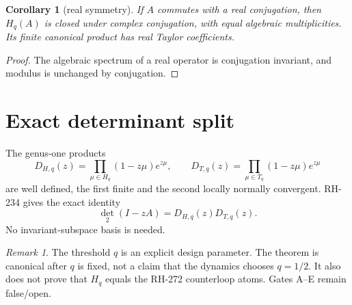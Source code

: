 \documentclass[11pt]{article}
\newtheorem{corollary}[theorem]{Corollary}
\theoremstyle{remark}\newtheorem{remark}[theorem]{Remark}
\begin{document}
\begin{corollary}[real symmetry]
If $A$ commutes with a real conjugation, then $H_q(A)$ is closed under complex
conjugation, with equal algebraic multiplicities.  Its finite canonical
product has real Taylor coefficients.
\end{corollary}
\begin{proof}
The algebraic spectrum of a real operator is conjugation invariant, and
modulus is unchanged by conjugation.
\end{proof}

\section{Exact determinant split}
The genus-one products
\[
 D_{H,q}(z)=\prod_{\mu\in H_q}(1-z\mu)e^{z\mu},\qquad
 D_{T,q}(z)=\prod_{\mu\in T_q}(1-z\mu)e^{z\mu}
\]
are well defined, the first finite and the second locally normally
convergent.  RH-234 gives the exact identity
\[
 \det_2(I-zA)=D_{H,q}(z)D_{T,q}(z).
\]
No invariant-subspace basis is needed.

\begin{remark}
The threshold $q$ is an explicit design parameter.  The theorem is canonical
after $q$ is fixed, not a claim that the dynamics chooses $q=1/2$.  It also
does not prove that $H_q$ equals the RH-272 counterloop atoms.  Gates A--E
remain false/open.
\end{remark}
\end{document}
